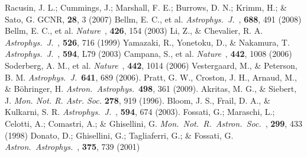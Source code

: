\documentclass[12pt]{article}
\def\aap{{\it Astron.~Astrophys.}~}
\def\apj{{\it Astrophys.~J.}~}
\def\mnras{{\it Mon.~Not.~R.~Astron.~Soc.}~}
\def\nat{{\it Nature}~}
\begin{document}
\begin{thebibliography}{99}
 Racusin, J. L.; Cummings, J.; Marshall, F. E.; Burrows, D. N.; Krimm, H.; \& Sato, G. GCNR, {\bf 28}, 3 (2007)	
 Bellm, E. C., et al. \apj, {\bf 688}, 491 (2008)	
 Bellm, E. C., et al. \nat, {\bf 426}, 154 (2003)	
 Li, Z., \& Chevalier, R. A. \apj, {\bf 526}, 716 (1999)	
 Yamazaki, R., Yonetoku, D., \& Nakamura, T. \apj, {\bf 594}, L79 (2003)	
 Campana, S., et al. \nat, {\bf 442}, 1008 (2006)	
 Soderberg, A. M., et al. \nat, {\bf 442}, 1014 (2006)	
 Vestergaard, M., \& Peterson, B. M.  \apj \textbf{641}, 689 (2006).	
 Pratt, G. W., Croston, J. H., Arnaud, M., \& B\"ohringer, H. \aap \textbf{498}, 361 (2009).	
 Akritas, M. G., \& Siebert, J.  \emph{Mon. Not. R. Astr. Soc.} 	\textbf{278}, 919 (1996).	
 Bloom, J. S., Frail, D. A., \& Kulkarni, S. R. \apj, {\bf 594}, 674 (2003).	
 Fossati, G.; Maraschi, L.; Celotti, A.; Comastri, A.; \& Ghisellini, G. \mnras, {\bf 299}, 433 (1998)	
 Donato, D.; Ghisellini, G.; Tagliaferri, G.; \& Fossati, G. \aap, {\bf 375}, 739 (2001)	
\end{thebibliography}

\clearpage
\end{document}
